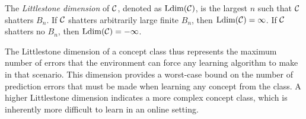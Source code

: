 \begin{definition}
\label{def:Ldim}
    The \emph{Littlestone dimension} of $\mathcal{C}$, denoted as $\operatorname{Ldim}(\mathcal{C})$, is the largest $n$ such that $\mathcal{C}$ shatters $B_n$. If $\mathcal{C}$ shatters arbitrarily large finite $B_n$, then $\operatorname{Ldim}(\mathcal{C})=\infty$. If $\mathcal{C}$ shatters no $B_n$, then $\operatorname{Ldim}(\mathcal{C})=-\infty$. 
\end{definition}


The Littlestone dimension of a concept class thus represents the maximum number of errors that the environment can force any learning algorithm to make in that scenario. This dimension provides a worst-case bound on the number of prediction errors that must be made when learning any concept from the class. A higher Littlestone dimension indicates a more complex concept class, which is inherently more difficult to learn in an online setting.


